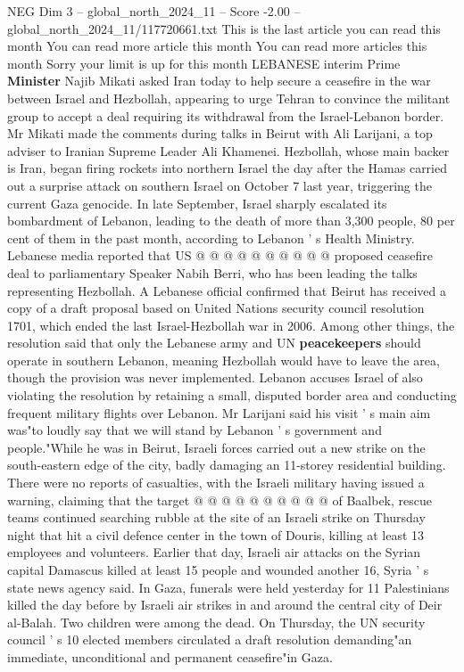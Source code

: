 \begin{textsample}{NEG Dim 3 – global\_north\_2024\_11 – Score -2.00 – global\_north\_2024\_11/117720661.txt}  \label{ex:f3_neg_273}
This is the last article you can read this month You can read more article this month You can read more articles this month Sorry your limit is up for this month LEBANESE interim Prime \textbf{Minister} Najib Mikati asked Iran today to help secure a ceasefire in the war between Israel and Hezbollah, appearing to urge Tehran to convince the militant group to accept a deal requiring its withdrawal from the Israel-Lebanon border.
Mr Mikati made the comments during talks in Beirut with Ali Larijani, a top adviser to Iranian Supreme Leader Ali Khamenei.
Hezbollah, whose main backer is Iran, began firing rockets into northern Israel the day after the Hamas carried out a surprise attack on southern Israel on October 7 last year, triggering the current Gaza genocide.
In late September, Israel sharply escalated its bombardment of Lebanon, leading to the death of more than 3,300 people, 80 per cent of them in the past month, according to Lebanon ' s Health Ministry.
Lebanese media reported that US @ @ @ @ @ @ @ @ @ @ proposed ceasefire deal to parliamentary Speaker Nabih Berri, who has been leading the talks representing Hezbollah.
A Lebanese official confirmed that Beirut has received a copy of a draft proposal based on United Nations security council resolution 1701, which ended the last Israel-Hezbollah war in 2006.
Among other things, the resolution said that only the Lebanese army and UN \textbf{peacekeepers} should operate in southern Lebanon, meaning Hezbollah would have to leave the area, though the provision was never implemented.
Lebanon accuses Israel of also violating the resolution by retaining a small, disputed border area and conducting frequent military flights over Lebanon.
Mr Larijani said his visit ' s main aim was"to loudly say that we will stand by Lebanon ' s government and people."While he was in Beirut, Israeli forces carried out a new strike on the south-eastern edge of the city, badly damaging an 11-storey residential building.
There were no reports of casualties, with the Israeli military having issued a warning, claiming that the target @ @ @ @ @ @ @ @ @ @ of Baalbek, rescue teams continued searching rubble at the site of an Israeli strike on Thursday night that hit a civil defence center in the town of Douris, killing at least 13 employees and volunteers.
Earlier that day, Israeli air attacks on the Syrian capital Damascus killed at least 15 people and wounded another 16, Syria ' s state news agency said.
In Gaza, funerals were held yesterday for 11 Palestinians killed the day before by Israeli air strikes in and around the central city of Deir al-Balah.
Two children were among the dead.
On Thursday, the UN security council ' s 10 elected members circulated a draft resolution demanding"an immediate, unconditional and permanent ceasefire"in Gaza.

\end{textsample}
